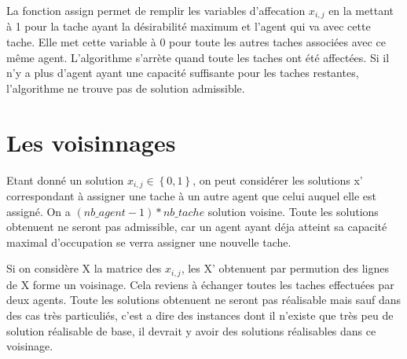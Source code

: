 \documentclass{article}
\begin{document}


La fonction assign permet de remplir les variables d'affecation $x_{i,j}$ en la mettant à 1 pour la tache ayant la désirabilité maximum et l'agent qui va avec cette tache. Elle met cette variable à 0 pour toute les autres taches associées avec ce même agent.
L'algorithme s'arrète quand toute les taches ont été affectées. Si il n'y a plus d'agent ayant une capacité suffisante pour les taches restantes, l'algorithme ne trouve pas de solution admissible.

\section{Les voisinnages}

Etant donné un solution $x_{i,j}\in\left\{0,1\right\}$, on peut considérer les solutions x' correspondant à assigner une tache à un autre agent que celui auquel elle est assigné. On a $(nb\_agent-1)*nb\_tache$ solution voisine. Toute les solutions obtenuent ne seront pas admissible, car un agent ayant déja atteint sa capacité maximal d'occupation se verra assigner une nouvelle tache.



Si on considère X la matrice des $x_{i,j}$, les X' obtenuent par permution des lignes de X forme un voisinage. Cela reviens à échanger toutes les taches effectuées par deux agents. Toute les solutions obtenuent ne seront pas réalisable mais sauf dans des cas très particuliés, c'est a dire des instances dont il n'existe que très peu de solution réalisable de base, il devrait y avoir des solutions réalisables dans ce voisinage.
\end{document}
